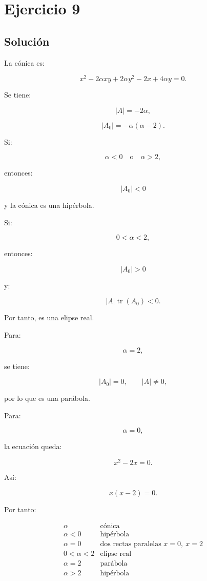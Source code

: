 \documentclass[11pt,a4paper]{article}
\newcommand{\tr}{\operatorname{tr}}
\begin{document}
\section{Ejercicio 9}
\subsection{Solución}

La cónica es:

\[
x^2-2\alpha xy+2\alpha y^2-2x+4\alpha y=0.
\]

Se tiene:

\[
|A|=-2\alpha,
\]

\[
|A_0|
=
-\alpha(\alpha-2).
\]

Si:

\[
\alpha<0
\quad\text{o}\quad
\alpha>2,
\]

entonces:

\[
|A_0|<0
\]

y la cónica es una hipérbola.

Si:

\[
0<\alpha<2,
\]

entonces:

\[
|A_0|>0
\]

y:

\[
|A|\tr(A_0)<0.
\]

Por tanto, es una elipse real.

Para:

\[
\alpha=2,
\]

se tiene:

\[
|A_0|=0,
\qquad
|A|\neq0,
\]

por lo que es una parábola.

Para:

\[
\alpha=0,
\]

la ecuación queda:

\[
x^2-2x=0.
\]

Así:

\[
x(x-2)=0.
\]

Por tanto:

\[
\boxed{
\begin{array}{c|c}
\alpha & \text{cónica}\\
\hline
\alpha<0 & \text{hipérbola}\\
\alpha=0 & \text{dos rectas paralelas }x=0,\ x=2\\
0<\alpha<2 & \text{elipse real}\\
\alpha=2 & \text{parábola}\\
\alpha>2 & \text{hipérbola}
\end{array}
}
\]
\end{document}
